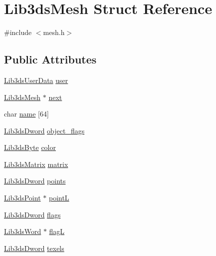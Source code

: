 \hypertarget{struct_lib3ds_mesh}{\section{Lib3ds\-Mesh Struct Reference}
\label{struct_lib3ds_mesh}
}


{\ttfamily \#include $<$mesh.\-h$>$}

\subsection*{Public Attributes}
\begin{DoxyCompactItemize}
\item 
\hyperlink{union_lib3ds_user_data}{Lib3ds\-User\-Data} \hyperlink{struct_lib3ds_mesh_ae0517a931b1c83f1229a547aecbede5f}{user}
\item 
\hyperlink{struct_lib3ds_mesh}{Lib3ds\-Mesh} $\ast$ \hyperlink{struct_lib3ds_mesh_ab9cc0d0b74dc5a908e4c8482b9426868}{next}
\item 
char \hyperlink{struct_lib3ds_mesh_a6da27bc5e8b74b243ac241fecf5b1149}{name} \mbox{[}64\mbox{]}
\item 
\hyperlink{types_8h_a299c9663303144c562f6bd92c2f273d3}{Lib3ds\-Dword} \hyperlink{struct_lib3ds_mesh_a1e5c4f2c31a644d3570916a98587f722}{object\-\_\-flags}
\item 
\hyperlink{types_8h_a0b5424d44e4d56efb0ec0c398eeb7d3d}{Lib3ds\-Byte} \hyperlink{struct_lib3ds_mesh_a20db34abe42b9176bc553cff5d705201}{color}
\item 
\hyperlink{group__matrix_ga6f58ff2ebfcf09ca5b5cda2f3dc1cb74}{Lib3ds\-Matrix} \hyperlink{struct_lib3ds_mesh_ad2343eac26e3d3b0a692003db67ef2f5}{matrix}
\item 
\hyperlink{types_8h_a299c9663303144c562f6bd92c2f273d3}{Lib3ds\-Dword} \hyperlink{struct_lib3ds_mesh_a55e11a6fdf1a89dbff135f529238b0b0}{points}
\item 
\hyperlink{struct_lib3ds_point}{Lib3ds\-Point} $\ast$ \hyperlink{struct_lib3ds_mesh_aa1c06370102a3788f92e41857d94b614}{point\-L}
\item 
\hyperlink{types_8h_a299c9663303144c562f6bd92c2f273d3}{Lib3ds\-Dword} \hyperlink{struct_lib3ds_mesh_ac3aa76003f7bc2acb8fe0f81b01a13bc}{flags}
\item 
\hyperlink{types_8h_a439f68d12f4ad080599044949e41dba1}{Lib3ds\-Word} $\ast$ \hyperlink{struct_lib3ds_mesh_ad954a1b0ae2fa69f836c21b56940c113}{flag\-L}
\item 
\hyperlink{types_8h_a299c9663303144c562f6bd92c2f273d3}{Lib3ds\-Dword} \hyperlink{struct_lib3ds_mesh_afa402f2017ea15f2049445ee41d92036}{texels}

\end{DoxyCompactItemize}
